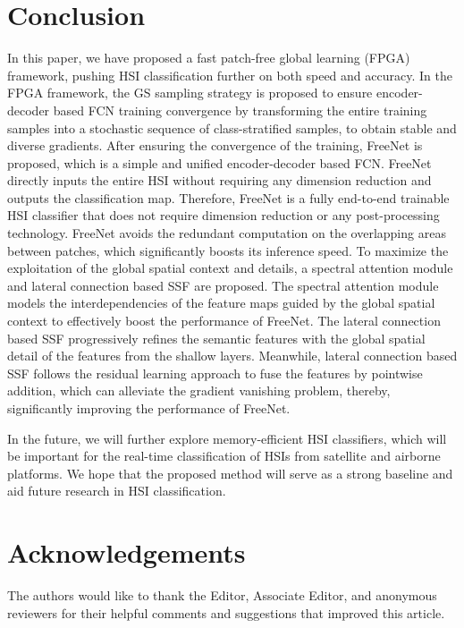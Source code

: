 \documentclass[journal]{IEEEtran}
\begin{document}
\section{Conclusion}
\label{sec:conclusion}
In this paper, we have proposed a fast patch-free global learning (FPGA) framework, pushing HSI classification further on both speed and accuracy.
In the FPGA framework, the GS sampling strategy is proposed to ensure encoder-decoder based FCN training convergence by transforming the entire training samples into a stochastic sequence of class-stratified samples, to obtain stable and diverse gradients.
After ensuring the convergence of the training, FreeNet is proposed, which is a simple and unified encoder-decoder based FCN. 
FreeNet directly inputs the entire HSI without requiring any dimension reduction and outputs the classification map.
Therefore, FreeNet is a fully end-to-end trainable HSI classifier that does not require dimension reduction or any post-processing technology.
FreeNet avoids the redundant computation on the overlapping areas between patches, which significantly boosts its inference speed.
To maximize the exploitation of the global spatial context and details, a spectral attention module and lateral connection based SSF are proposed.
The spectral attention module models the interdependencies of the feature maps guided by the global spatial context to effectively boost the performance of FreeNet.
The lateral connection based SSF progressively refines the semantic features with the global spatial detail of the features from the shallow layers.
Meanwhile, lateral connection based SSF follows the residual learning approach to fuse the features by pointwise addition, which can alleviate the gradient vanishing problem, thereby, significantly improving the performance of FreeNet.

In the future, we will further explore memory-efficient HSI classifiers, which will be important for the real-time classification of HSIs from satellite and airborne platforms.
We hope that the proposed method will serve as a strong baseline and aid future research in HSI classification.



\section*{Acknowledgements}
The authors would like to thank the Editor, Associate Editor, and anonymous reviewers for their helpful comments and suggestions that improved this article.




\ifCLASSOPTIONcaptionsoff
  \newpage
\fi
\end{document}
